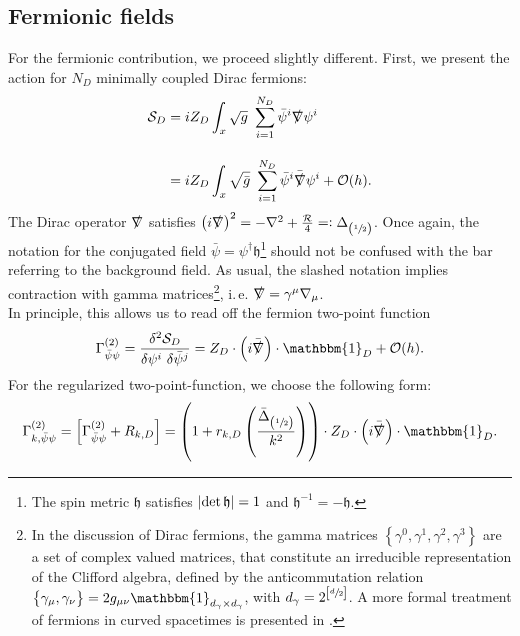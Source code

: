 \subsection{Fermionic  fields}
For the fermionic contribution, we  proceed slightly different. First, we present the action for $N_D$ minimally coupled Dirac fermions:
\begin{equation}
	\begin{aligned}
		\mathcal{S}_D &= iZ_D\int_x \sqrt{g} \ \sum\limits_{i=1}^{N_D}\bar{\psi}^{i}\slashed{\nabla}\psi^{i} \\[10pt]
		&=  iZ_D\int_x \sqrt{\bar{g}} \ \sum\limits_{i=1}^{N_D}\bar{\psi}^{i}\bar{\slashed{\nabla}}\psi^{i} + \mathcal{O}(h).
	\end{aligned}
\end{equation}
The Dirac operator $\slashed{\nabla}$ satisfies $\left(i\slashed{\nabla}\right)^2 = -\nabla^2 + \frac{\mathcal{R}}{4} =: \Delta_{\left(\sfrac{1}{2}\right)}$.
Once again, the notation for the conjugated field $\bar{\psi} = \psi^{\dagger}\mathfrak{h}$\footnote{The spin metric $\mathfrak{h}$ satisfies $\abs{\operatorname{det} \mathfrak{h}} = 1$ and $\mathfrak{h}^{-1} = -\mathfrak{h}$.} should not be confused with the bar referring to the background field. As usual, the slashed notation implies contraction with gamma matrices\footnote{In the discussion of Dirac fermions, the gamma matrices $\left\{\gamma^0, \gamma^1, \gamma^2, \gamma^3\right\}$ are a set of complex valued matrices, that constitute an irreducible representation of the Clifford algebra, defined by the anticommutation relation $\left\{\gamma_{\mu}, \gamma_{\nu}\right\}= 2g_{\mu\nu} \mathbbm{1}_{d_{\gamma}\times d_{\gamma}}$, with $d_{\gamma} = 2^{\left[\sfrac{d}{2}\right]}$. A more formal treatment of fermions in curved spacetimes is presented in \cite{LippoldtPHD}.}, i.\,e. $\slashed{\nabla} = \gamma^{\mu}\nabla_{\mu}$.  \\
In principle, this allows us to read off the fermion two-point function
\begin{align}
	\Gamma^{(2)}_{\bar{\psi}\psi} = \frac{\delta^2 \mathcal{S}_D}{\delta \psi^{i}\ \delta \bar{\psi}^{j}} = Z_D\cdot\left(i\bar{\slashed{\nabla}}\right)\cdot\mathbbm{1}_D + \mathcal{O}(h).
\end{align}
For the regularized two-point-function, we choose the following form:
\begin{equation}
\Gamma^{(2)}_{k, \bar{\psi}\psi} = \left[\Gamma^{(2)}_{\bar{\psi}\psi} + R_{k,D}\right] = \left(1+r_{k,D}\left(\frac{ \bar{\Delta}_{\left(\sfrac{1}{2}\right)}}{k^2}\right)\right)\cdot Z_D\cdot\left(i\bar{\slashed{\nabla}}\right)\cdot\mathbbm{1}_D. \label{eqn:fermion_propagator}
\end{equation}
